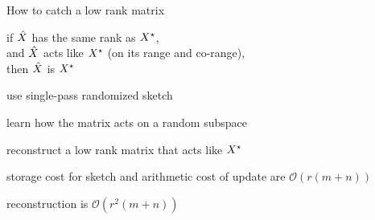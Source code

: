\documentclass[presentation,xcolor={usenames,dvipsnames}]{beamer}
\begin{document}
\begin{frame}{How to catch a low rank matrix}

\begin{center}
if $\hat{X}$ has the same rank as $X^\star$, \\
and $\hat{X}$ acts like $X^\star$ (on its range and co-range), \\
then $\hat{X}$ is $X^\star$
\end{center}


use single-pass randomized sketch \cite{tropp2019streaming,tropp2017fixed,tropp2017practical}
\bit
\item learn how the matrix acts on a random subspace
\item reconstruct a low rank matrix that acts like $X^\star$
\item storage cost for sketch and arithmetic cost of update are
$\mathcal{O}(r(m+n))$
\item reconstruction is $\mathcal{O}(r^2(m+n))$
\eit

\end{frame}
\end{document}
